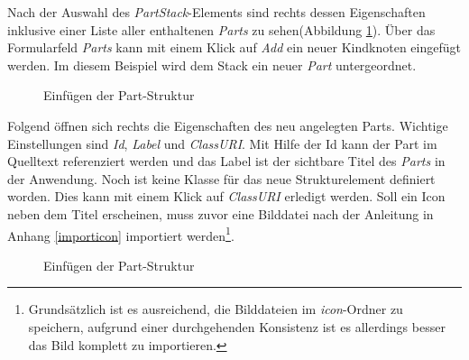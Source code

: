 Nach der Auswahl des \textit{PartStack}-Elements sind rechts dessen Eigenschaften inklusive einer Liste aller enthaltenen \textit{Parts} zu sehen(Abbildung \ref{partadd}). Über das Formularfeld \textit{Parts} kann mit einem Klick auf \textit{Add} ein neuer Kindknoten eingefügt werden. Im diesem Beispiel wird dem Stack ein neuer \textit{Part} untergeordnet.

\begin{figure}[H]
  \vspace{0.5cm}
  \centering
   \caption{Einfügen der Part-Struktur}
  \label{partadd}
  \vspace{0.5cm}
\end{figure}

Folgend öffnen sich rechts die Eigenschaften des neu angelegten Parts. Wichtige Einstellungen sind \textit{Id}, \textit{Label} und \textit{ClassURI}. Mit Hilfe der Id kann der Part im Quelltext referenziert werden und das Label ist der sichtbare Titel des \textit{Parts} in der Anwendung. Noch ist keine Klasse für das neue Strukturelement definiert worden. Dies kann mit einem Klick auf \textit{ClassURI} erledigt werden. Soll ein Icon neben dem Titel erscheinen, muss zuvor eine Bilddatei nach der Anleitung in Anhang \ref{importicon} importiert werden\footnote{Grundsätzlich ist es ausreichend, die Bilddateien im \textit{icon}-Ordner zu speichern, aufgrund einer durchgehenden Konsistenz ist es allerdings besser das Bild komplett zu importieren.}.

\begin{figure}[H]
  \vspace{0.5cm}
  \centering
   \caption{Einfügen der Part-Struktur}
  \label{partpart}
  \vspace{0.5cm}
\end{figure}

